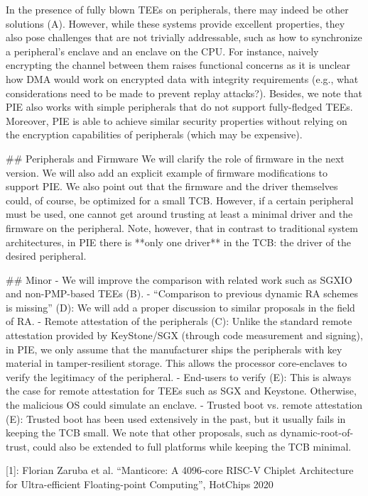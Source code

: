 In the presence of fully blown TEEs on peripherals, there may indeed be other solutions (A). However, while these systems provide excellent properties, they also pose challenges that are not trivially addressable, such as how to synchronize a peripheral’s enclave and an enclave on the CPU. For instance, naively encrypting the channel between them raises functional concerns as it is unclear how DMA would work on encrypted data with integrity requirements (e.g., what considerations need to be made to prevent replay attacks?). Besides, we note that PIE also works with simple peripherals that do not support fully-fledged TEEs. Moreover, PIE is able to achieve similar security properties without relying on the encryption capabilities of peripherals (which may be expensive).

## Peripherals and Firmware
We will clarify the role of firmware in the next version. We will also add an explicit example of firmware modifications to support PIE. We also point out that the firmware and the driver themselves could, of course, be optimized for a small TCB. However, if a certain peripheral must be used, one cannot get around trusting at least a minimal driver and the firmware on the peripheral. Note, however, that in contrast to traditional system architectures, in PIE there is **only one driver** in the TCB: the driver of the desired peripheral.

## Minor
- We will improve the comparison with related work such as SGXIO and non-PMP-based TEEs (B).
- “Comparison to previous dynamic RA schemes is missing” (D): We will add a proper discussion to similar proposals in the field of RA.
- Remote attestation of the peripherals (C): Unlike the standard remote attestation provided by KeyStone/SGX (through code measurement and signing), in PIE, we only assume that the manufacturer ships the peripherals with key material in tamper-resilient storage. This allows the processor core-enclaves to verify the legitimacy of the peripheral.
- End-users to verify (E): This is always the case for remote attestation for TEEs such as SGX and Keystone. Otherwise, the malicious OS could simulate an enclave.
- Trusted boot vs. remote attestation (E): Trusted boot has been used extensively in the past, but it usually fails in keeping the TCB small. We note that other proposals, such as dynamic-root-of-trust, could also be extended to full platforms while keeping the TCB minimal.


[1]: Florian Zaruba et al. “Manticore: A 4096-core RISC-V Chiplet Architecture for Ultra-efficient Floating-point Computing”, HotChips 2020